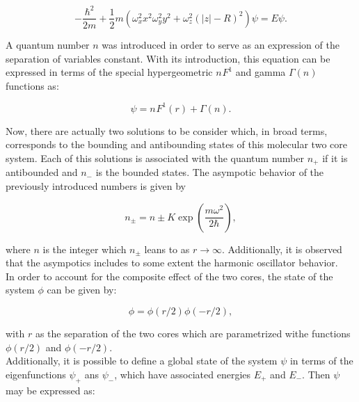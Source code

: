 \documentclass[openany]{book}
\begin{document}
\begin{equation}\label{eq:micro_twoCenterShell_differentialEquation}
	-\frac{\hbar^2}{2m} + \frac{1}{2}m (\omega^2_x  x^2  \omega^2_y y^2 + \omega^2_z (|z| - R)^2) \psi = E \psi.
\end{equation}

A quantum number $n$ was introduced in order to serve as an expression of the separation of variables constant. With its introduction, this equation can be expressed in terms of the special hypergeometric ${n}^{}F^{1}$ and gamma $\Gamma(n)$ functions as:

\begin{equation}\label{eq:micro_twoCenterShell_solution_specialFunctions}
	\psi = {n}^{}F^{1} (r) + \Gamma(n).
\end{equation}

Now, there are actually two solutions to be consider which, in broad terms, corresponds to the bounding and antibounding states of this molecular two core system. Each of this solutions is associated with the quantum number $n_+$ if it is antibounded and $n_-$ is the bounded states. The asympotic behavior of the previously introduced numbers is given by 

\begin{equation}\label{eq:micro_twoCenterShell_solution_asymptotic}
	n_\pm = n \pm K \exp {\left(\frac{m\omega^2}{2\hbar }\right)},
\end{equation}

where $n$ is the integer which $n_\pm$ leans to as $r \rightarrow \infty$. Additionally, it is observed that the asympotics includes to some extent the harmonic oscillator behavior. \\

In order to account for the composite effect of the two cores, the state of the system $\phi$ can be given by: 

\begin{equation} \label{eq:micro_twoCenterShell_solution_system}
	\phi = \phi(r/2) \phi(-r/2),
\end{equation}

with $r$ as the separation of the two cores which are parametrized withe functions $\phi(r/2) $ and $ \phi(-r/2)$.  \\

Additionally, it is possible to define a global state of the system $\psi$ in terms of the eigenfunctions $\psi_+$ ans $\psi_-$, which have associated energies $E_+$ and $E_-$. Then $\psi$ may be expressed as: 
\end{document}
